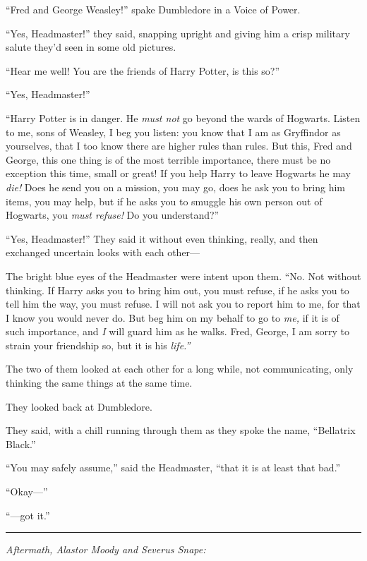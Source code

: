 ``Fred and George Weasley!'' spake Dumbledore in a Voice of Power.

``Yes, Headmaster!'' they said, snapping upright and giving him a crisp
military salute they'd seen in some old pictures.

``Hear me well! You are the friends of Harry Potter, is this so?''

``Yes, Headmaster!''

``Harry Potter is in danger. He \emph{must not} go beyond the wards of
Hogwarts. Listen to me, sons of Weasley, I beg you listen: you know that
I am as Gryffindor as yourselves, that I too know there are higher rules
than rules. But this, Fred and George, this one thing is of the most
terrible importance, there must be no exception this time, small or
great! If you help Harry to leave Hogwarts he may \emph{die!} Does he
send you on a mission, you may go, does he ask you to bring him items,
you may help, but if he asks you to smuggle his own person out of
Hogwarts, you \emph{must refuse!} Do you understand?''

``Yes, Headmaster!'' They said it without even thinking, really, and
then exchanged uncertain looks with each other---

The bright blue eyes of the Headmaster were intent upon them. ``No. Not
without thinking. If Harry asks you to bring him out, you must refuse,
if he asks you to tell him the way, you must refuse. I will not ask you
to report him to me, for that I know you would never do. But beg him on
my behalf to go to \emph{me,} if it is of such importance, and \emph{I}
will guard him as he walks. Fred, George, I am sorry to strain your
friendship so, but it is his \emph{life.''}

The two of them looked at each other for a long while, not
communicating, only thinking the same things at the same time.

They looked back at Dumbledore.

They said, with a chill running through them as they spoke the name,
``Bellatrix Black.''

``You may safely assume,'' said the Headmaster, ``that it is at least
that bad.''

``Okay---''

``---got it.''

\begin{center}\rule{3in}{0.4pt}\end{center}

\emph{Aftermath, Alastor Moody and Severus Snape:}

